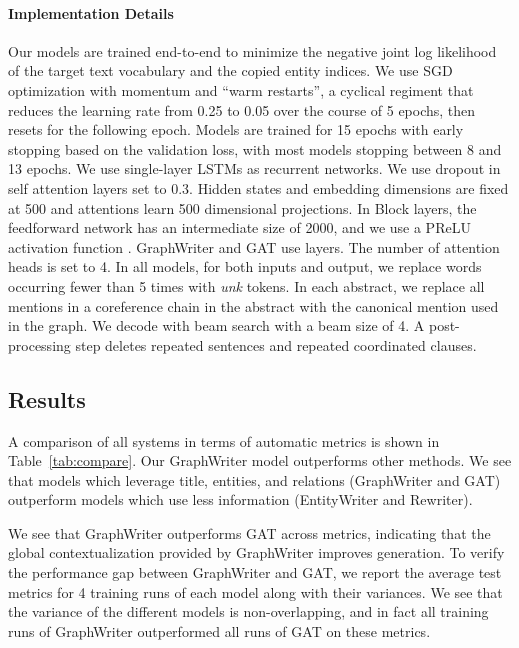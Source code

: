 \documentclass[11pt,a4paper]{article}
\begin{document}
\paragraph{Implementation Details}
Our models are trained end-to-end to minimize the negative joint log likelihood of the target text vocabulary and the copied entity indices. 
We use SGD optimization with momentum \cite{Qian1999OnTM} and ``warm restarts'', a cyclical regiment that reduces the learning rate from 0.25 to 0.05 over the course of 5 epochs, then resets for the following epoch.
Models are trained for 15 epochs with early stopping \cite{Prechelt:1998} based on the validation loss, with most models stopping between 8 and 13 epochs. 
We use single-layer LSTMs \cite{Hochreiter:1997} as recurrent networks.
We use dropout \cite{Srivastava:2014} in self attention layers set to 0.3.
Hidden states and embedding dimensions are fixed at 500 and attentions learn 500 dimensional projections.
In Block layers, the feedforward network has an intermediate size of 2000, and we use a PReLU activation function \cite{he2015delving}.
GraphWriter and GAT use  layers. 
The number of attention heads is set to 4. 
In all models, for both inputs and output, we replace words occurring fewer than 5 times with {\it unk} tokens. 
In each abstract, we replace all mentions in a coreference chain in the abstract with the canonical mention used in the graph.
We decode with beam search \cite{graves2012sequence,sutskever2014sequence} with a beam size of 4. 
A post-processing step deletes repeated sentences and repeated coordinated clauses.



\subsection{Results} 
A comparison of all systems in terms of automatic metrics is shown in Table~\ref{tab:compare}.
Our GraphWriter model outperforms other methods.
We see that models which leverage title, entities, and relations (GraphWriter and GAT) outperform models which use less information (EntityWriter and Rewriter). 

We see that GraphWriter outperforms GAT across metrics, indicating that the global contextualization provided by GraphWriter improves generation. 
To verify the performance gap between GraphWriter and GAT, we report the average test metrics for 4 training runs of each model along with their variances. 
We see that the variance of the different models is non-overlapping, and in fact all training runs of GraphWriter outperformed all runs of GAT on these metrics. 
\end{document}
